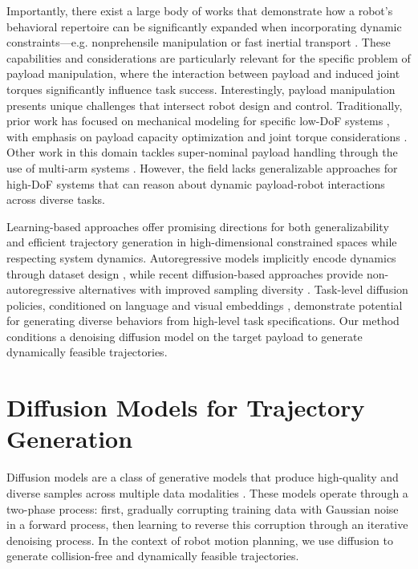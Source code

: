 Importantly, there exist a large body of works that demonstrate how a robot's behavioral repertoire can be significantly expanded when incorporating dynamic constraints---e.g. nonprehensile manipulation \cite{dogar2011framework,pasricha2022pokerrt,ruggiero2018nonprehensile,yu2016more,zeng2020tossingbot} or fast inertial transport \cite{arrizabalaga2024slosh,ichnowski2022gomp,muchacho2022solution,avigal2022gomp}.
These capabilities and considerations are particularly relevant for the specific problem of payload manipulation, where the interaction between payload and induced joint torques significantly influence task success.
Interestingly, payload manipulation presents unique challenges that intersect robot design and control.
Traditionally, prior work has focused on mechanical modeling for specific low-DoF systems \cite{wang2001payload}, with emphasis on payload capacity optimization \cite{korayem2008maximum} and joint torque considerations \cite{nho2003intelligent}. Other work in this domain tackles super-nominal payload handling through the use of multi-arm systems \cite{kim2021enhancing,yan2016coordinated}.
However, the field lacks generalizable approaches for high-DoF systems that can reason about dynamic payload-robot interactions across diverse tasks.

Learning-based approaches offer promising directions for both generalizability and efficient trajectory generation in high-dimensional constrained spaces while respecting system dynamics. Autoregressive models implicitly encode dynamics through dataset design \cite{fishman2023motion,qureshi2020motion}, while recent diffusion-based approaches provide non-autoregressive alternatives with improved sampling diversity \cite{carvalho2023motion,saha2024edmp}. Task-level diffusion policies, conditioned on language and visual embeddings \cite{ajay2023is,chi2023diffusionpolicy}, demonstrate potential for generating diverse behaviors from high-level task specifications.
Our method conditions a denoising diffusion model on the target payload to generate dynamically feasible trajectories.

\section{Diffusion Models for Trajectory Generation}
\label{payload:sec:diffusion}

Diffusion models are a class of generative models that produce high-quality and diverse samples across multiple data modalities \cite{ho2020denoising}.
These models operate through a two-phase process: first, gradually corrupting training data with Gaussian noise in a forward process, then learning to reverse this corruption through an iterative denoising process.
In the context of robot motion planning, we use diffusion to generate collision-free and dynamically feasible trajectories.

